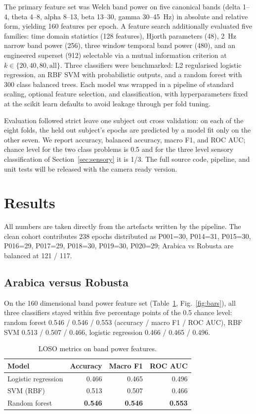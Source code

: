 \documentclass[conference]{IEEEtran}
\begin{document}
The primary feature set was Welch \cite{welch1967} band power on five canonical bands (delta 1--4, theta 4--8, alpha 8--13, beta 13--30, gamma 30--45~Hz) in absolute and relative form, yielding 160 features per epoch. A feature search additionally evaluated five families: time domain statistics (128 features), Hjorth parameters (48), 2~Hz narrow band power (256), three window temporal band power (480), and an engineered superset (912) selectable via a mutual information criterion at $k \in \{20, 40, 80, \text{all}\}$. Three classifiers were benchmarked: L2 regularised logistic regression, an RBF SVM with probabilistic outputs, and a random forest with 300 class balanced trees. Each model was wrapped in a pipeline of standard scaling, optional feature selection, and classification, with hyperparameters fixed at the scikit learn defaults \cite{pedregosa2011} to avoid leakage through per fold tuning.

Evaluation followed strict leave one subject out cross validation: on each of the eight folds, the held out subject's epochs are predicted by a model fit only on the other seven. We report accuracy, balanced accuracy, macro F1, and ROC AUC; chance level for the two class problems is 0.5 and for the three level sensory classification of Section~\ref{sec:sensory} it is 1/3. The full source code, pipeline, and unit tests will be released with the camera ready version.

\section{Results}
All numbers are taken directly from the artefacts written by the pipeline. The clean cohort contributes 238 epochs distributed as P001=30, P014=31, P015=30, P016=29, P017=29, P018=30, P019=30, P020=29; Arabica vs Robusta are balanced at 121 / 117.

\subsection{Arabica versus Robusta}
On the 160 dimensional band power feature set (Table~\ref{tab:loso-bp}, Fig.~\ref{fig:bars}), all three classifiers stayed within five percentage points of the 0.5 chance level: random forest 0.546 / 0.546 / 0.553 (accuracy / macro F1 / ROC AUC), RBF SVM 0.513 / 0.507 / 0.466, logistic regression 0.466 / 0.465 / 0.496.

\begin{table}[ht]
  \centering
  \caption{LOSO metrics on band power features.}
  \label{tab:loso-bp}
  \footnotesize
  \begin{tabular}{l r r r}
    \toprule
    \textbf{Model} & \textbf{Accuracy} & \textbf{Macro F1} & \textbf{ROC AUC} \\
    \midrule
    Logistic regression & 0.466 & 0.465 & 0.496 \\
    SVM (RBF)           & 0.513 & 0.507 & 0.466 \\
    Random forest       & \textbf{0.546} & \textbf{0.546} & \textbf{0.553} \\
    \bottomrule
  \end{tabular}
\end{table}
\end{document}

